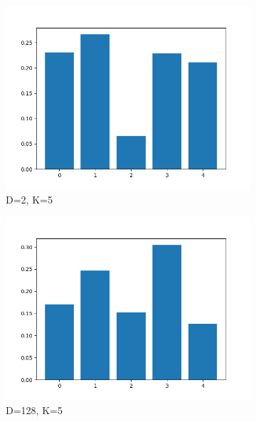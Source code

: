\documentclass[conference]{IEEEtran}
\begin{document}
\begin{figure}
    \centering
    \begin{subfigure}[b]{.5\linewidth}
        \centering
        \includegraphics[width=1\linewidth]{images/eval/weights_BGMM_d2_k5.png}
        \caption{D=2, K=5}
        \label{fig:dblp_weights_d2_k5}
    \end{subfigure}%
    \begin{subfigure}[b]{.5\linewidth}
        \centering
        \includegraphics[width=1\linewidth]{images/eval/weights_BGMM_d128_k5.png}
        \caption{D=128, K=5}
        \label{fig:dblp_weights_d128_k5}
    \end{subfigure}
    \begin{subfigure}[b]{.5\linewidth}

\end{subfigure}
\end{figure}
\end{document}
